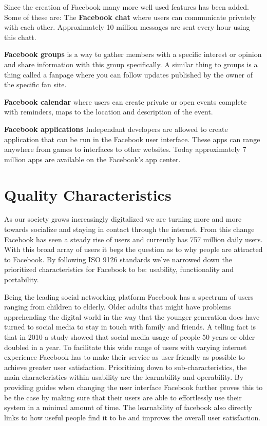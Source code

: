 \documentclass[conference]{IEEEtran}
\begin{document}
Since the creation of Facebook many more well used features has been added. Some of these are:
The {\bf Facebook chat} where users can communicate privately with each other. Approximately 10 million messages are sent every hour using this chatt. \cite{StatisticBrain}

{\bf Facebook groups} is a way to gather members with a specific interest or opinion and share information with this group specifically. A similar thing to groups is a thing called a fanpage where you can follow updates published by the owner of the specific fan site.

{\bf Facebook calendar} where users can create private or open events complete with reminders, maps to the location and description of the event.

{\bf Facebook applications} Independant developers are allowed to create application that can be run in the Facebook user interface. These apps can range anywhere from games to interfaces to other websites. Today approximately 7 million apps are available on the Facebook's app center.\cite{StatisticBrain}

\section{Quality Characteristics}
\label{quality}

As our society grows increasingly digitalized we are turning more and more towards socialize and staying in contact through the internet. From this change Facebook has seen a steady rise of users\cite{foster} and currently has 757 million daily users\cite{smith2014}. With this broad array of users it begs the question as to why people are attracted to Facebook. By following ISO 9126 standards we’ve narrowed down the prioritized characteristics for Facebook to be: usability, functionality and portability.

Being the leading social networking platform Facebook has a spectrum of users ranging from children to elderly. Older adults that might have problems apprehending the digital world in the way that the younger generation does have turned to social media to stay in touch with family and friends. A telling fact is that in 2010 a study showed that social media usage of people 50 years or older doubled in a year\cite{madden2010}. To facilitate this wide range of users with varying internet experience Facebook has to make their service as user-friendly as possible to achieve greater user satisfaction\cite{rauniar2012}. Prioritizing down to sub-characteristics, the main characteristics within usability are the learnability and operability. By providing guides when changing the user interface Facebook further proves this to be the case by making sure that their users are able to effortlessly use their system in a minimal amount of time.
The learnability of facebook also directly links to how useful people find it to be and improves the overall user satisfaction\cite{choi2014}.
\end{document}
